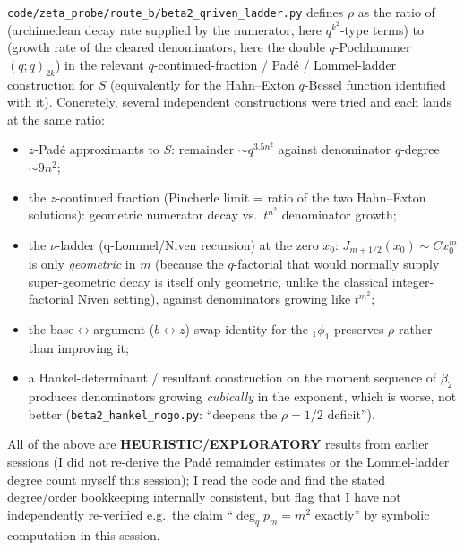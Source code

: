 \documentclass[11pt]{article}
\begin{document}
\texttt{code/zeta\_probe/route\_b/beta2\_qniven\_ladder.py} defines $\rho$ as the ratio of
(archimedean decay rate supplied by the numerator, here $q^{k^2}$-type terms) to (growth rate of
the cleared denominators, here the double $q$-Pochhammer $(q;q)_{2k}$) in the relevant
$q$-continued-fraction / Padé / Lommel-ladder construction for $S$ (equivalently for the
Hahn--Exton $q$-Bessel function identified with it). Concretely, several independent
constructions were tried and each lands at the same ratio:
\begin{itemize}
\item $z$-Padé approximants to $S$: remainder $\sim q^{3.5n^2}$ against denominator $q$-degree
$\sim 9n^2$;
\item the $z$-continued fraction (Pincherle limit = ratio of the two Hahn--Exton solutions):
geometric numerator decay vs.\ $t^{n^2}$ denominator growth;
\item the $\nu$-ladder (q-Lommel/Niven recursion) at the zero $x_0$: $J_{m+1/2}(x_0)\sim
Cx_0^m$ is only \emph{geometric} in $m$ (because the $q$-factorial that would normally supply
super-geometric decay is itself only geometric, unlike the classical integer-factorial Niven
setting), against denominators growing like $t^{m^2}$;
\item the base$\leftrightarrow$argument ($b\leftrightarrow z$) swap identity for the
${}_1\phi_1$ preserves $\rho$ rather than improving it;
\item a Hankel-determinant / resultant construction on the moment sequence of $\beta_2$
produces denominators growing \emph{cubically} in the exponent, which is worse, not better
(\texttt{beta2\_hankel\_nogo.py}: ``deepens the $\rho=1/2$ deficit'').
\end{itemize}
All of the above are \textbf{HEURISTIC/EXPLORATORY} results from earlier sessions (I did not
re-derive the Padé remainder estimates or the Lommel-ladder degree count myself this session);
I read the code and find the stated degree/order bookkeeping internally consistent, but flag
that I have not independently re-verified e.g.\ the claim ``$\deg_q p_m = m^2$ exactly'' by
symbolic computation in this session.
\end{document}
